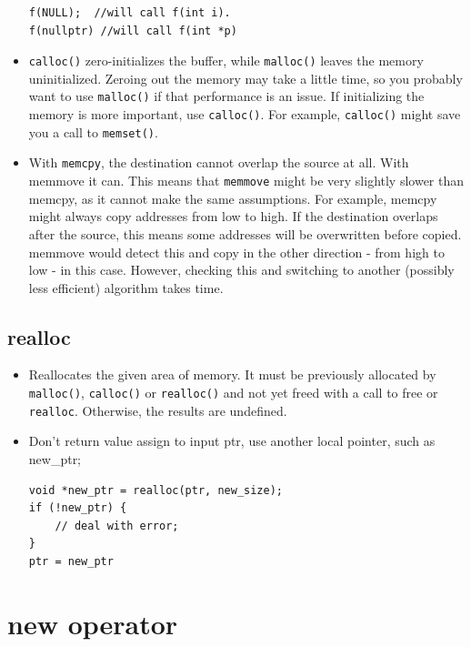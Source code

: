 \documentclass[a4paper,11pt,twoside]{book}
\begin{document}
\begin{itemize}
\begin{lstlisting}[numbers=none]
f(NULL);  //will call f(int i).
f(nullptr) //will call f(int *p)
\end{lstlisting}
	
	\item \texttt{calloc()} zero-initializes the buffer, while \texttt{malloc()} leaves the memory uninitialized. Zeroing out the memory may take a little time, so you probably want to use \texttt{malloc()} if that performance is an issue. If initializing the memory is more important, use \texttt{calloc()}. For example, \texttt{calloc()} might save you a call to \texttt{memset()}.
	
	\item With \texttt{memcpy}, the destination cannot overlap the source at all. With memmove it can. This means that \texttt{memmove} might be very slightly slower than memcpy, as it cannot make the same assumptions. For example, memcpy might always copy addresses from low to high. If the destination overlaps after the source, this means some addresses will be overwritten before copied. memmove would detect this and copy in the other direction - from high to low - in this case. However, checking this and switching to another (possibly less efficient) algorithm takes time.
\end{itemize}

\subsection{realloc}
\begin{itemize}
	
	\item Reallocates the given area of memory. It must be previously allocated by \texttt{malloc()}, \texttt{calloc()} or \texttt{realloc()} and not yet freed with a call to free or \texttt{realloc}. Otherwise, the results are undefined.
	
	
	\item Don't return value assign to input ptr, use another local pointer, such as new\_ptr;
\begin{lstlisting}[numbers=none]
void *new_ptr = realloc(ptr, new_size);
if (!new_ptr) {
	// deal with error;
}
ptr = new_ptr
\end{lstlisting}
\end{itemize}


\section{new operator}
\end{document}
